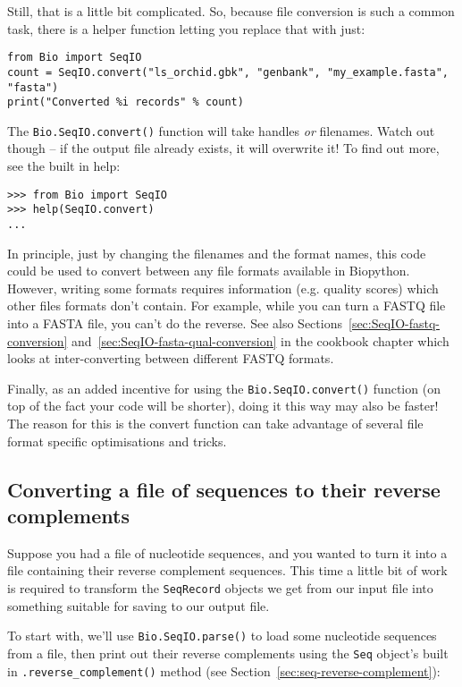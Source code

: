 Still, that is a little bit complicated. So, because file conversion is such a
common task, there is a helper function letting you replace that with just:

\begin{verbatim}
from Bio import SeqIO
count = SeqIO.convert("ls_orchid.gbk", "genbank", "my_example.fasta", "fasta")
print("Converted %i records" % count)
\end{verbatim}

The \verb|Bio.SeqIO.convert()| function will take handles \emph{or} filenames.
Watch out though -- if the output file already exists, it will overwrite it!
To find out more, see the built in help:

\begin{verbatim}
>>> from Bio import SeqIO
>>> help(SeqIO.convert)
...
\end{verbatim}

In principle, just by changing the filenames and the format names, this code
could be used to convert between any file formats available in Biopython.
However, writing some formats requires information (e.g. quality scores) which
other files formats don't contain. For example, while you can turn a FASTQ
file into a FASTA file, you can't do the reverse. See also
Sections~\ref{sec:SeqIO-fastq-conversion} and~\ref{sec:SeqIO-fasta-qual-conversion}
in the cookbook chapter which looks at inter-converting between different FASTQ formats.

Finally, as an added incentive for using the \verb|Bio.SeqIO.convert()| function
(on top of the fact your code will be shorter), doing it this way may also be
faster! The reason for this is the convert function can take advantage of
several file format specific optimisations and tricks.

\subsection{Converting a file of sequences to their reverse complements}
\label{sec:SeqIO-reverse-complement}

Suppose you had a file of nucleotide sequences, and you wanted to turn it into a file containing their reverse complement sequences.  This time a little bit of work is required to transform the \verb|SeqRecord| objects we get from our input file into something suitable for saving to our output file.

To start with, we'll use \verb|Bio.SeqIO.parse()| to load some nucleotide
sequences from a file, then print out their reverse complements using
the \verb|Seq| object's built in \verb|.reverse_complement()| method (see Section~\ref{sec:seq-reverse-complement}):

